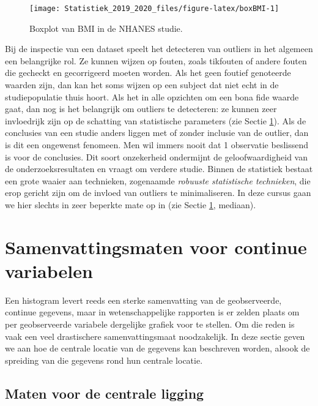 \documentclass[12pt,dutch,coursenotes]{book}
\theoremstyle{definition}
\theoremstyle{definition}
\theoremstyle{definition}
\theoremstyle{remark}
\begin{document}
\begin{figure}

{\centering \texttt{[image: Statistiek\_2019\_2020\_files/figure-latex/boxBMI-1]} 

}

\caption{Boxplot van BMI in de NHANES studie.}\label{fig:boxBMI}
\end{figure}

Bij de inspectie van een dataset speelt het detecteren van outliers in
het algemeen een belangrijke rol. Ze kunnen wijzen op fouten, zoals
tikfouten of andere fouten die gecheckt en gecorrigeerd moeten worden.
Als het geen foutief genoteerde waarden zijn, dan kan het soms wijzen op
een subject dat niet echt in de studiepopulatie thuis hoort. Als het in
alle opzichten om een bona fide waarde gaat, dan nog is het belangrijk
om outliers te detecteren: ze kunnen zeer invloedrijk zijn op de
schatting van statistische parameters (zie Sectie \ref{sec:summarize}).
Als de conclusies van een studie anders liggen met of zonder inclusie
van de outlier, dan is dit een ongewenst fenomeen. Men wil immers nooit
dat 1 observatie beslissend is voor de conclusies. Dit soort onzekerheid
ondermijnt de geloofwaardigheid van de onderzoeksresultaten en vraagt om
verdere studie. Binnen de statistiek bestaat een grote waaier aan
technieken, zogenaamde \emph{robuuste statistische technieken}, die erop
gericht zijn om de invloed van outliers te minimaliseren. In deze cursus
gaan we hier slechts in zeer beperkte mate op in (zie Sectie
\ref{sec:summarize}, mediaan).

\section{Samenvattingsmaten voor continue
variabelen}\label{sec:summarize}

Een histogram levert reeds een sterke samenvatting van de geobserveerde,
continue gegevens, maar in wetenschappelijke rapporten is er zelden
plaats om per geobserveerde variabele dergelijke grafiek voor te
stellen. Om die reden is vaak een veel drastischere samenvattingsmaat
noodzakelijk. In deze sectie geven we aan hoe de centrale locatie van de
gegevens kan beschreven worden, alsook de spreiding van die gegevens
rond hun centrale locatie.

\subsection{Maten voor de centrale
ligging}\label{maten-voor-de-centrale-ligging}
\end{document}

